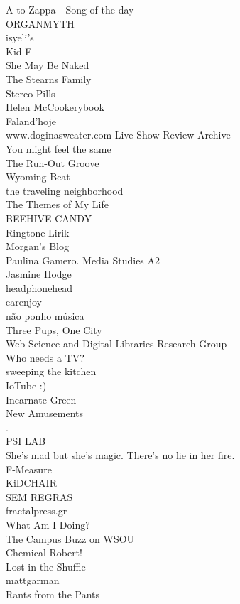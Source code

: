 \documentclass[10pt,letterpaper]{article}
\begin{document}
A to Zappa - Song of the day\\
ORGANMYTH\\
isyeli's\\
Kid F\\
She May Be Naked\\
The Stearns Family\\
Stereo Pills\\
Helen McCookerybook\\
Faland'hoje\\
www.doginasweater.com Live Show Review Archive\\
You might feel the same\\
The Run-Out Groove\\
Wyoming Beat\\
the traveling neighborhood\\
The Themes of My Life\\
BEEHIVE CANDY\\
Ringtone Lirik\\
Morgan's Blog\\
Paulina Gamero. Media Studies A2\\
Jasmine Hodge\\
headphonehead\\
earenjoy\\
não ponho música\\
Three Pups, One City\\
Web Science and Digital Libraries Research Group\\
Who needs a TV?\\
sweeping the kitchen\\
IoTube     :)\\
Incarnate Green\\
New Amusements\\
.\\
PSI LAB\\
She's mad but she's magic. There's no lie in her fire.\\
F-Measure\\
KiDCHAIR\\
SEM REGRAS\\
fractalpress.gr\\
What Am I Doing?\\
The Campus Buzz on WSOU\\
Chemical Robert!\\
Lost in the Shuffle\\
mattgarman\\
Rants from the Pants\\
\end{document}
